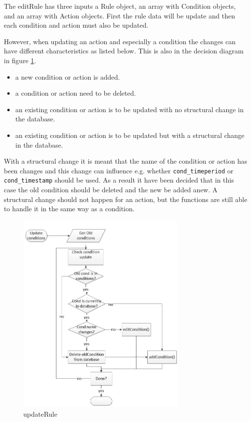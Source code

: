 The editRule has three inputs a Rule object, an array with Condition objects, and an array with Action objects. First the rule data will be update and then each condition and action must also be updated. 

However, when updating an action and especially a condition the changes can have different characteristics as listed below. This is also in the decision diagram in figure \ref{fig:updateRule}.

\begin{itemize}
	\item a new condition or action is added.
	\item a condition or action need to be deleted.
	\item an existing condition or action is to be updated with no structural change in the database.
	\item an existing condition or action is to be updated but with a structural change in the database.
\end{itemize}

With a structural change it is meant that the name of the condition or action has been changes and this change can influence e.g. whether \texttt{cond\_timeperiod} or \texttt{cond\_timestamp} should be used. As a result it have been decided that in this case the old condition should be deleted and the new be added anew. A structural change should not happen for an action, but the functions are still able to handle it in the same way as a condition.

\begin{figure}
	\centering
		\includegraphics[width=0.75\textwidth]{images/updateRule.jpg}
	\caption{updateRule}
	\label{fig:updateRule}
\end{figure}



